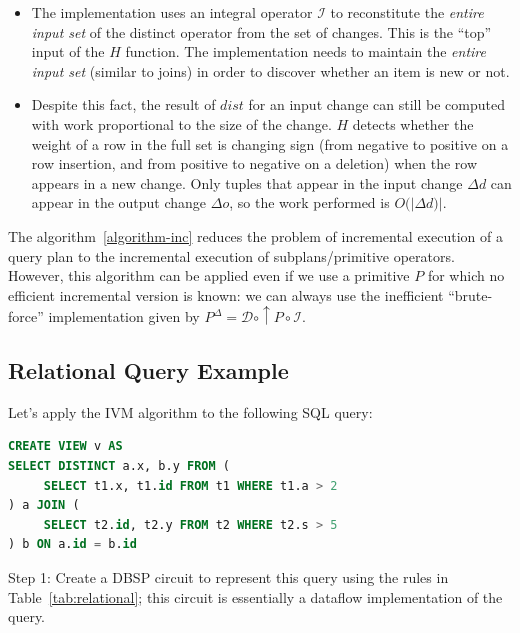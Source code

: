 \documentclass[twocolumn
]{svjour3}
\numberwithin{equation}{section}
\newcommand{\dbsp}{DBSP\xspace}
\newcommand{\I}{\mathcal{I}}  %
\newcommand{\D}{\mathcal{D}}  %
\newcommand{\I}{\mathit{I}}  %
\newcommand{\D}{\mathit{D}}  %
\newcommand{\inc}[1]{{#1}^{\Delta}}
\newcommand{\distinct}{\mathit{dist}}  %
\newcommand{\lift}[1]{{\uparrow}#1}
\begin{document}
\begin{itemize}
  \item The implementation uses an integral operator $\I$ to
    reconstitute the \emph{entire input set} of the distinct operator
    from the set of changes.  This is the ``top'' input of the $H$
    function.  The implementation needs to maintain the \emph{entire
    input set} (similar to joins) in order to discover whether an item
    is new or not.
  \item Despite this fact, the result of $\distinct$ for an input
    change can still be computed with work proportional to the size of
    the change.  $H$ detects whether the weight of a row in the full
    set is changing sign (from negative to positive on a row
    insertion, and from positive to negative on a deletion) when the
    row appears in a new change.  Only tuples that appear in
    the input change $\Delta d$ can appear in the output change
    $\Delta o$, so the work performed is $O(|\Delta d)|$.
\end{itemize}

The algorithm~\ref{algorithm-inc} reduces the problem of incremental
execution of a query plan to the incremental execution of
sub\-plans/primitive operators.  However, this algorithm can be
applied even if we use a primitive $P$ for which no efficient
incremental version is known: we can always use the inefficient
``brute-force'' implementation given by $\inc{P} = \D \circ \lift{P}
\circ \I$.

\vspace{-3ex}
%
\subsection{Relational Query Example}\label{sec:relational-example}

Let's apply the IVM algorithm to the following SQL query:
\begin{lstlisting}[language=SQL,basicstyle=\small\ttfamily]
CREATE VIEW v AS
SELECT DISTINCT a.x, b.y FROM (
     SELECT t1.x, t1.id FROM t1 WHERE t1.a > 2
) a JOIN (
     SELECT t2.id, t2.y FROM t2 WHERE t2.s > 5
) b ON a.id = b.id
\end{lstlisting}

\vspace{-1.6ex}

Step 1: Create a \dbsp circuit to represent this query using the rules
in Table~\ref{tab:relational}; this circuit is essentially a dataflow
implementation of the query.
\end{document}
